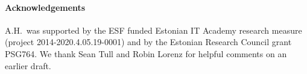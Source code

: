 \documentclass[submission]{eptcs}
\begin{document}
    \paragraph*{\bf Acknowledgements}
        A.H.\ was supported by the ESF funded Estonian IT Academy research measure (project 2014-2020.4.05.19-0001) and by the Estonian Research Council grant PSG764.
        We thank Sean Tull and Robin Lorenz for helpful comments on an earlier draft.

    
    
    
    
    
    

	\nocite{*}
	\begin{raggedright}
	
	
	\end{raggedright}
	
    
\end{document}
